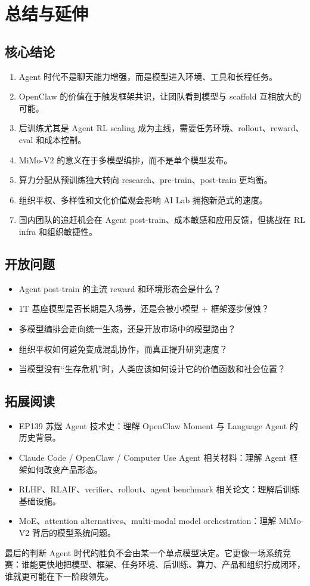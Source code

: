 \documentclass[a4paper]{article}
\begin{document}
\section{总结与延伸}

\subsection{核心结论}

\begin{enumerate}
\item Agent 时代不是聊天能力增强，而是模型进入环境、工具和长程任务。
\item OpenClaw 的价值在于触发框架共识，让团队看到模型与 scaffold 互相放大的可能。
\item 后训练尤其是 Agent RL scaling 成为主线，需要任务环境、rollout、reward、eval 和成本控制。
\item MiMo-V2 的意义在于多模型编排，而不是单个模型发布。
\item 算力分配从预训练独大转向 research、pre-train、post-train 更均衡。
\item 组织平权、多样性和文化价值观会影响 AI Lab 拥抱新范式的速度。
\item 国内团队的追赶机会在 Agent post-train、成本敏感和应用反馈，但挑战在 RL infra 和组织敏捷性。
\end{enumerate}

\subsection{开放问题}

\begin{itemize}
\item Agent post-train 的主流 reward 和环境形态会是什么？
\item 1T 基座模型是否长期是入场券，还是会被小模型 + 框架逐步侵蚀？
\item 多模型编排会走向统一生态，还是开放市场中的模型路由？
\item 组织平权如何避免变成混乱协作，而真正提升研究速度？
\item 当模型没有“生存危机”时，人类应该如何设计它的价值函数和社会位置？
\end{itemize}

\subsection{拓展阅读}

\begin{itemize}
\item EP139 苏煜 Agent 技术史：理解 OpenClaw Moment 与 Language Agent 的历史背景。
\item Claude Code / OpenClaw / Computer Use Agent 相关材料：理解 Agent 框架如何改变产品形态。
\item RLHF、RLAIF、verifier、rollout、agent benchmark 相关论文：理解后训练基础设施。
\item MoE、attention alternatives、multi-modal model orchestration：理解 MiMo-V2 背后的模型系统问题。
\end{itemize}

\begin{importantbox}{最后的判断}
Agent 时代的胜负不会由某一个单点模型决定。它更像一场系统竞赛：谁能更快地把模型、框架、任务环境、后训练、算力、产品和组织拧成闭环，谁就更可能在下一阶段领先。
\end{importantbox}
\end{document}
